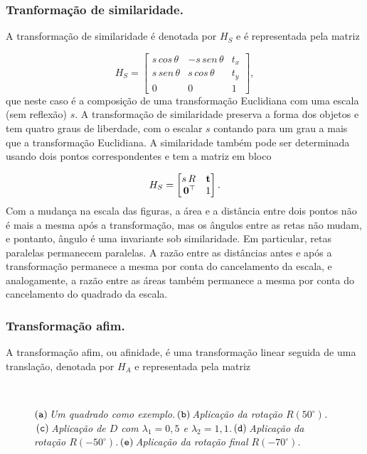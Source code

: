 \subsubsection*{Tranformação de similaridade.}
A transformação de similaridade é denotada por $H_S$ e é representada pela matriz 

\begin{equation*}
H_S=
\begin{bmatrix}
s\,cos\,\theta&-s\,sen\,\theta&t_x\\
s\,sen\,\theta&s\,cos\,\theta&t_y\\
0&0&1
\end{bmatrix},
\end{equation*} 
que neste caso é a composição de uma transformação Euclidiana com uma escala (sem reflexão) $s$. A transformação de similaridade preserva a forma dos objetos e tem quatro graus de liberdade, com o escalar $s$ contando para um grau a mais que a transformação Euclidiana. A similaridade também pode ser determinada usando dois pontos correspondentes e tem a matriz em bloco

\begin{equation*}
H_S=
\begin{bmatrix}
s\,R&{\bf t}\\
\,{\bf 0}^\top&1
\end{bmatrix}.
\end{equation*}
Com a mudança na escala das figuras, a área e a distância entre dois pontos não é mais a mesma após a transformação, mas os ângulos entre as retas não mudam, e pontanto, ângulo é uma invariante sob similaridade. Em particular, retas paralelas permanecem paralelas. A razão entre as distâncias antes e após a transformação permanece a mesma por conta do cancelamento da escala, e analogamente, a razão entre as áreas também permanece a mesma por conta do cancelamento do quadrado da escala.

\subsubsection*{Transformação afim.}
A transformação afim, ou afinidade, é uma transformação linear seguida de uma translação, denotada por $H_A$ e representada pela matriz

\begin{figure}[!htb]
\centering
{}
\,
\,
\,
\,
\caption{$({\tt a})\,$\textit{Um quadrado como exemplo.}$\,({\tt b})\,$\textit{Aplicação da rotação $R(50^\circ)$.}$\,({\tt c})\,$\textit{Aplicação de $D$ com $\lambda_1=0,5$ e $\lambda_2=1,1$.}$\,({\tt d})\,$\textit{Aplicação da rotação $R(-50^\circ)$.}$\,({\tt e})\,$\textit{Aplicação da rotação final $R(-70^\circ)$.}}
\label{fig.angulos-afinidades}
\end{figure}

